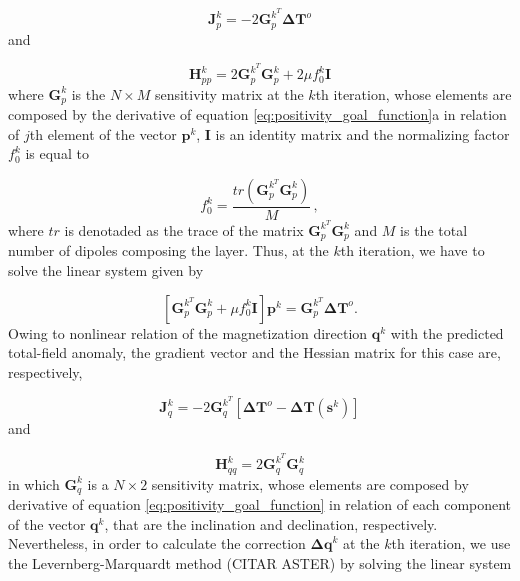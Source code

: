 \begin{equation}
\mathbf{J}_{p}^{k} = -2 \mathbf{G}_{p}^{k^T} \mathbf{\Delta T}^o
\label{eq:grad_p}
\end{equation}   
and   

\begin{equation}
\mathbf{H}_{pp}^{k} = 2 \mathbf{G}_{p}^{k^T} \mathbf{G}_{p}^{k} + 2 \mu f_{0}^{k} \mathbf{I} 
\label{eq:hess_p}
\end{equation}
where $\mathbf{G}_p^{k}$ is the $N \times M$ sensitivity matrix at the $k$th iteration, whose elements are composed by the derivative of equation \ref{eq:positivity_goal_function}a in relation of $j$th element of the vector $\mathbf{p}^k$, $\mathbf{I}$ is an identity matrix and the normalizing factor $f_{0}^{k}$ is equal to

\begin{equation}
f_{0}^{k} = \dfrac{tr(\mathbf{G}_{p}^{k^T} \mathbf{G}_{p}^{k})}{M} \, ,
\label{eq:norm_factor}
\end{equation}
where $tr$ is denotaded as the trace of the matrix $\mathbf{G}_{p}^{k^T} \mathbf{G}_{p}^{k}$ and $M$ is the total number of dipoles composing the layer. Thus, at the $k$th iteration, we have to solve the linear system given by

\begin{equation}
\left[ \mathbf{G}_{p}^{k^T} \mathbf{G}_{p}^{k} + \mu f_{0}^{k} \mathbf{I} \right] \mathbf{p}^{k} = \mathbf{G}_{p}^{k^T} \mathbf{\Delta T}^o.
\label{eq:linear_sys_p}
\end{equation} 
Owing to nonlinear relation of the magnetization direction $\mathbf{q}^k$ with the predicted total-field anomaly, the gradient vector and the Hessian matrix for this case are, respectively,

\begin{equation}
\mathbf{J}_{q}^{k} = -2 \mathbf{G}_{q}^{k^T} [ \mathbf{\Delta T}^o -  \mathbf{\Delta T} (\mathbf{s}^k) ] 
\label{eq:grad_q}
\end{equation}   
and   

\begin{equation}
\mathbf{H}_{qq}^{k} = 2 \mathbf{G}_{q}^{k^T} \mathbf{G}_{q}^{k} 
\label{eq:hess_q}
\end{equation}
in which $\mathbf{G}_q^k$ is a $N \times 2$ sensitivity matrix, whose elements are composed by derivative of equation \ref{eq:positivity_goal_function} in relation of each component of the vector $\mathbf{q}^k$, that are the inclination and declination, respectively. Nevertheless, in order to calculate the correction $\mathbf{\Delta q}^k$ at the $k$th iteration, we use the Levernberg-Marquardt method (CITAR ASTER) by solving the linear system

